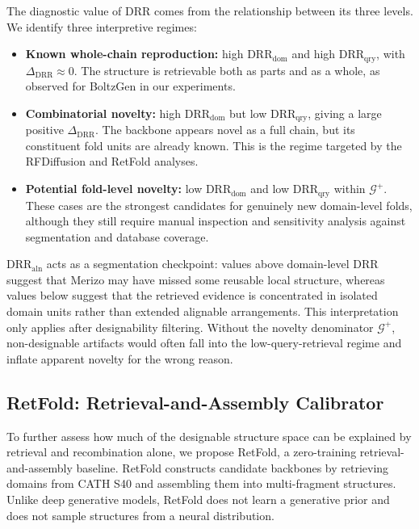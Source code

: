 \documentclass[letterpaper]{article} %
\begin{document}
The diagnostic value of DRR comes from the relationship between its three levels. We identify three interpretive regimes:
\begin{itemize}
\item \textbf{Known whole-chain reproduction:} high $\mathrm{DRR}_{\mathrm{dom}}$ and high $\mathrm{DRR}_{\mathrm{qry}}$, with $\Delta_{\mathrm{DRR}} \approx 0$. The structure is retrievable both as parts and as a whole, as observed for BoltzGen in our experiments.
\item \textbf{Combinatorial novelty:} high $\mathrm{DRR}_{\mathrm{dom}}$ but low $\mathrm{DRR}_{\mathrm{qry}}$, giving a large positive $\Delta_{\mathrm{DRR}}$. The backbone appears novel as a full chain, but its constituent fold units are already known. This is the regime targeted by the RFDiffusion and RetFold analyses.
\item \textbf{Potential fold-level novelty:} low $\mathrm{DRR}_{\mathrm{dom}}$ and low $\mathrm{DRR}_{\mathrm{qry}}$ within $\mathcal{G}^{+}$. These cases are the strongest candidates for genuinely new domain-level folds, although they still require manual inspection and sensitivity analysis against segmentation and database coverage.
\end{itemize}
$\mathrm{DRR}_{\mathrm{aln}}$ acts as a segmentation checkpoint: values above domain-level DRR suggest that Merizo may have missed some reusable local structure, whereas values below suggest that the retrieved evidence is concentrated in isolated domain units rather than extended alignable arrangements. This interpretation only applies after designability filtering. Without the novelty denominator $\mathcal{G}^{+}$, non-designable artifacts would often fall into the low-query-retrieval regime and inflate apparent novelty for the wrong reason.

\subsection{RetFold: Retrieval-and-Assembly Calibrator}

To further assess how much of the designable structure space can be explained by retrieval and recombination alone, we propose RetFold, a zero-training retrieval-and-assembly baseline. RetFold constructs candidate backbones by retrieving domains from CATH S40 and assembling them into multi-fragment structures. Unlike deep generative models, RetFold does not learn a generative prior and does not sample structures from a neural distribution.
\end{document}
